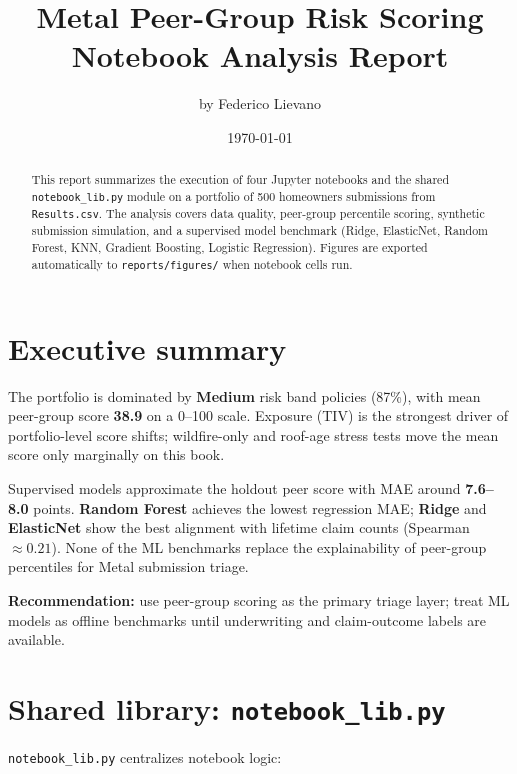 \documentclass[11pt,a4paper]{article}
\title{Metal Peer-Group Risk Scoring\\Notebook Analysis Report}
\author{by Federico Lievano}
\date{\today}
\begin{document}
\maketitle

\begin{abstract}
This report summarizes the execution of four Jupyter notebooks and the shared
\texttt{notebook\_lib.py} module on a portfolio of 500 homeowners submissions from
\texttt{Results.csv}. The analysis covers data quality, peer-group percentile scoring,
synthetic submission simulation, and a supervised model benchmark (Ridge, ElasticNet,
Random Forest, KNN, Gradient Boosting, Logistic Regression). Figures are exported
automatically to \texttt{reports/figures/} when notebook cells run.
\end{abstract}

\section{Executive summary}

The portfolio is dominated by \textbf{Medium} risk band policies (87\%), with mean
peer-group score \textbf{38.9} on a 0--100 scale. Exposure (TIV) is the strongest
driver of portfolio-level score shifts; wildfire-only and roof-age stress tests move
the mean score only marginally on this book.

Supervised models approximate the holdout peer score with MAE around \textbf{7.6--8.0}
points. \textbf{Random Forest} achieves the lowest regression MAE; \textbf{Ridge} and
\textbf{ElasticNet} show the best alignment with lifetime claim counts (Spearman
$\approx 0.21$). None of the ML benchmarks replace the explainability of peer-group
percentiles for Metal submission triage.

\textbf{Recommendation:} use peer-group scoring as the primary triage layer; treat ML
models as offline benchmarks until underwriting and claim-outcome labels are available.

\section{Shared library: \texttt{notebook\_lib.py}}

\texttt{notebook\_lib.py} centralizes notebook logic:
\end{document}
